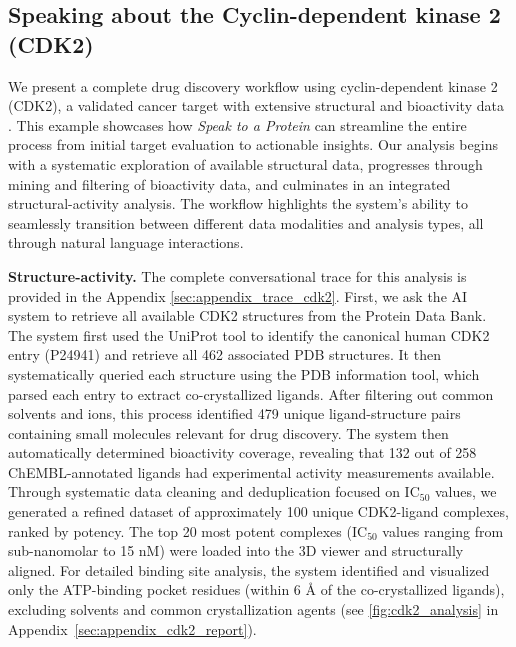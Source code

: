\documentclass{article}
\begin{document}
\subsection{Speaking about the Cyclin-dependent kinase 2 (CDK2)}

We present a complete drug discovery workflow using cyclin-dependent kinase 2 (CDK2), a validated cancer target with extensive structural and bioactivity data \citep{Malumbres2009}. This example showcases how \emph{Speak to a Protein} can streamline the entire process from initial target evaluation to actionable insights.
Our analysis begins with a systematic exploration of available structural data, progresses through mining and filtering of bioactivity data, and culminates in an integrated structural-activity analysis. The workflow highlights the system's ability to seamlessly transition between different data modalities and analysis types, all through natural language interactions.

\textbf{Structure-activity.} The complete conversational trace for this analysis is provided in the Appendix \ref{sec:appendix_trace_cdk2}. First, we ask the AI system to retrieve all available CDK2 structures from the Protein Data Bank. The system first used the UniProt tool to identify the canonical human CDK2 entry (P24941) and retrieve all 462 associated PDB structures. It then systematically queried each structure using the PDB information tool, which parsed each entry to extract co-crystallized ligands. After filtering out common solvents and ions, this process identified 479 unique ligand-structure pairs containing small molecules relevant for drug discovery.
The system then automatically determined bioactivity coverage, revealing that 132 out of 258 ChEMBL-annotated ligands had experimental activity measurements available. Through systematic data cleaning and deduplication focused on IC$_{50}$ values, we generated a refined dataset of approximately 100 unique CDK2-ligand complexes, ranked by potency.
The top 20 most potent complexes (IC$_{50}$ values ranging from sub-nanomolar to 15 nM) were loaded into the 3D viewer and structurally aligned. For detailed binding site analysis, the system identified and visualized only the ATP-binding pocket residues (within 6 \AA{} of the co-crystallized ligands), excluding solvents and common crystallization agents (see \cref{fig:cdk2_analysis} in Appendix~\ref{sec:appendix_cdk2_report}).
\end{document}
